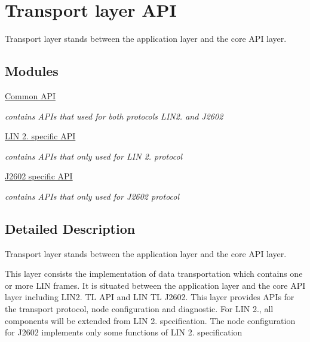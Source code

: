 \hypertarget{group__transport__group}{}\section{Transport layer A\+P\+I}
\label{group__transport__group}


Transport layer stands between the application layer and the core A\+P\+I layer.  


\subsection*{Modules}
\begin{DoxyCompactItemize}
\item 
\hyperlink{group__commontl__api__group}{Common A\+P\+I}
\begin{DoxyCompactList}\small\item\em contains A\+P\+Is that used for both protocols L\+I\+N2. and J2602 \end{DoxyCompactList}\item 
\hyperlink{group__lin21tl__api__group}{L\+I\+N 2. specific A\+P\+I}
\begin{DoxyCompactList}\small\item\em contains A\+P\+Is that only used for L\+I\+N 2. protocol \end{DoxyCompactList}\item 
\hyperlink{group__j2602tl__api__group}{J2602 specific A\+P\+I}
\begin{DoxyCompactList}\small\item\em contains A\+P\+Is that only used for J2602 protocol \end{DoxyCompactList}\end{DoxyCompactItemize}


\subsection{Detailed Description}
Transport layer stands between the application layer and the core A\+P\+I layer. 

This layer consists the implementation of data transportation which contains one or more L\+I\+N frames. It is situated between the application layer and the core A\+P\+I layer including L\+I\+N2. T\+L A\+P\+I and L\+I\+N T\+L J2602. This layer provides A\+P\+Is for the transport protocol, node configuration and diagnostic. For L\+I\+N 2., all components will be extended from L\+I\+N 2. specification. The node configuration for J2602 implements only some functions of L\+I\+N 2. specification 